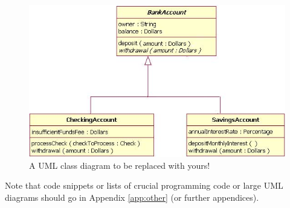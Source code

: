 \documentclass[a4paper, oneside, 11pt]{report}
\begin{document}
    \begin{figure}[htb]
        \includegraphics[width=1.0 \columnwidth]{class.png}
        \caption{A UML class diagram to be replaced with yours!}
        \label{class}
    \end{figure}





    Note that code snippets or lists of crucial programming code or large UML diagrams should go in Appendix \ref{app:other} (or further appendices).
\end{document}
